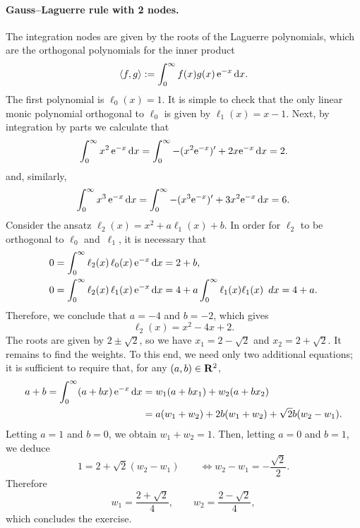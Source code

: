\begin{solution}
    \paragraph{Gauss--Laguerre rule with 2 nodes.}
    The integration nodes are given by the roots of the Laguerre polynomials,
    which are the orthogonal polynomials for the inner product
    \[
        \langle f, g\rangle :=
        \int_{0}^{\infty} f(x) g(x) \, \mathrm e^{-x} \, \mathrm d x.
    \]
    The first polynomial is $\ell_0(x) = 1$.
    It is simple to check that the only linear monic polynomial orthogonal to $\ell_0$ is given by $\ell_1(x) = x - 1$.
    Next, by integration by parts we calculate that
    \[
        \int_{0}^{\infty} x^2 \, \mathrm e^{-x} \, \mathrm d x
        = \int_{0}^{\infty} - (x^2 \mathrm e^{-x})' + 2 x \mathrm e^{-x} \, \mathrm d x = 2.
    \]
    and, similarly,
    \[
        \int_{0}^{\infty} x^3 \, \mathrm e^{-x} \, \mathrm d x
        = \int_{0}^{\infty} - (x^3 \mathrm e^{-x})' + 3 x^2 \mathrm e^{-x} \, \mathrm d x = 6.
    \]
    Consider the ansatz $\ell_2(x) = x^2 + a \ell_1(x) + b$.
    In order for $\ell_2$ to be orthogonal to $\ell_0$ and~$\ell_1$,
    it is necessary that
    \begin{align*}
        0 &= \int_{0}^{\infty} \ell_{2}(x) \, \ell_0(x) \, \mathrm e^{-x} \, \mathrm d x = 2 + b, \\
        0 &= \int_{0}^{\infty} \ell_{2}(x) \, \ell_1(x) \, \mathrm e^{-x} \, \mathrm d x
        = 4 + a \int_{0}^{\infty} \ell_1(x) \ell_1(x) \, \ d x = 4 + a.
    \end{align*}
    Therefore, we conclude that $a = -4$ and $b=-2$,
    which gives
    \[
        \ell_2(x) = x^2 - 4 x + 2.
    \]
    The roots are given by $2 \pm \sqrt{2}$,
    so we have $x_1 = 2 - \sqrt{2}$ and $x_2 = 2 + \sqrt{2}$.
    It remains to find the weights.
    To this end, we need only two additional equations;
    it is sufficient to require that, for any $(a,b) \in \mathbf R^2$,
    \begin{align*}
        a + b =
            \int_{0}^{\infty} (a + bx) \, \mathrm e^{-x} \, \mathrm d x
    &= w_1 (a + b x_1) + w_2 (a + b x_2) \\
    &= a (w_1 + w_2) + 2 b (w_1 + w_2) + \sqrt{2} b (w_2 - w_1).
    \end{align*}
    Letting $a = 1$ and $b = 0$,
    we obtain $w_1 + w_2 = 1$.
    Then, letting $a = 0$ and $b = 1$,
    we deduce
    \[
        1 = 2 + \sqrt{2} (w_2 - w_1) \qquad \Leftrightarrow w_2 - w_1 = - \frac{\sqrt{2}}{2}.
    \]
    Therefore
    \[
        w_1 = \frac{2 + \sqrt{2}}{4}, \qquad w_2 = \frac{2 - \sqrt{2}}{4},
    \]
    which concludes the exercise.
\end{solution}

